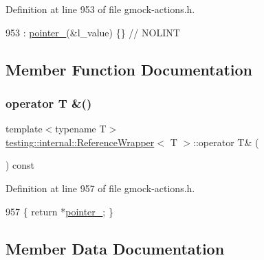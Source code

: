 Definition at line 953 of file gmock-\/actions.\+h.


\begin{DoxyCode}
953 : \hyperlink{classtesting_1_1internal_1_1ReferenceWrapper_abc085b4a0cdea43258c297c6989fdc7d}{pointer\_}(&l\_value) \{\}  \textcolor{comment}{// NOLINT}
\end{DoxyCode}


\subsection{Member Function Documentation}
\mbox{\label{classtesting_1_1internal_1_1ReferenceWrapper_a187d6e6ffb4031444fff10dee7dc7de8}} 
\subsubsection{\texorpdfstring{operator T \&()}{operator T \&()}}
{\footnotesize\ttfamily template$<$typename T$>$ \\
\hyperlink{classtesting_1_1internal_1_1ReferenceWrapper}{testing\+::internal\+::\+Reference\+Wrapper}$<$ T $>$\+::operator T\& (\begin{DoxyParamCaption}{ }\end{DoxyParamCaption}) const\hspace{0.3cm}{\ttfamily [inline]}}



Definition at line 957 of file gmock-\/actions.\+h.


\begin{DoxyCode}
957 \{ \textcolor{keywordflow}{return} *\hyperlink{classtesting_1_1internal_1_1ReferenceWrapper_abc085b4a0cdea43258c297c6989fdc7d}{pointer\_}; \}
\end{DoxyCode}


\subsection{Member Data Documentation}
\mbox{\label{classtesting_1_1internal_1_1ReferenceWrapper_abc085b4a0cdea43258c297c6989fdc7d}} 
